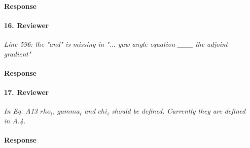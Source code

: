 \documentclass[]{article}
\begin{document}
\paragraph{Response} 

\hrulefill

\paragraph{16. Reviewer} \textit{Line 596: the "and" is missing in "... yaw angle equation \_\_\_ the adjoint gradient"}

\paragraph{Response} 

\hrulefill

\paragraph{17. Reviewer} \textit{In Eq. A13 $rho_i$, $gamma_i$ and $chi_i$ should be defined. Currently they are defined in A.4.}

\paragraph{Response} 

\hrulefill
\end{document}
